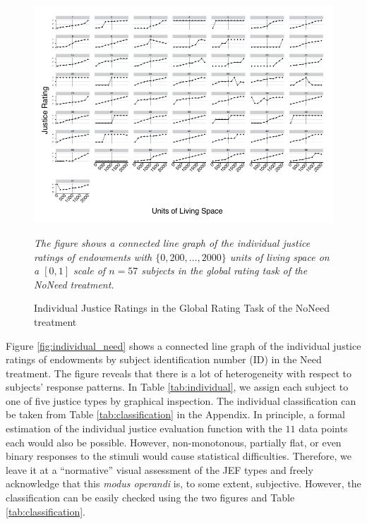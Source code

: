 \documentclass[12pt]{scrartcl}
\begin{document}
\begin{landscape}
\begin{figure}
   \centering
   \includegraphics{figures/figure_4.pdf}
   \begin{minipage}{0.7\linewidth}
      \footnotesize
      \textit{The figure shows a connected line graph of the individual justice ratings of endowments with $\{0,200,\ldots,2000\}$ units of living space on a $[0,1]$ scale of $n=57$ subjects in the global rating task of the NoNeed treatment.}
   \end{minipage}
   \caption{Individual Justice Ratings in the Global Rating Task of the NoNeed treatment}
   \label{fig:individual_noneed}
\end{figure}
\end{landscape}

Figure \ref{fig:individual_need} shows a connected line graph of the individual justice ratings of endowments by subject identification number (ID) in the Need treatment.
The figure reveals that there is a lot of heterogeneity with respect to subjects' response patterns.
In Table \ref{tab:individual}, we assign each subject to one of five justice types by graphical inspection.
The individual classification can be taken from Table \ref{tab:classification} in the Appendix.
In principle, a formal estimation of the individual justice evaluation function with the $11$ data points each would also be possible.
However, non-monotonous, partially flat, or even binary responses to the stimuli would cause statistical difficulties.
Therefore, we leave it at a ``normative'' visual assessment of the JEF types and freely acknowledge that this \textit{modus operandi} is, to some extent, subjective.
However, the classification can be easily checked using the two figures and Table \ref{tab:classification}.
\end{document}

